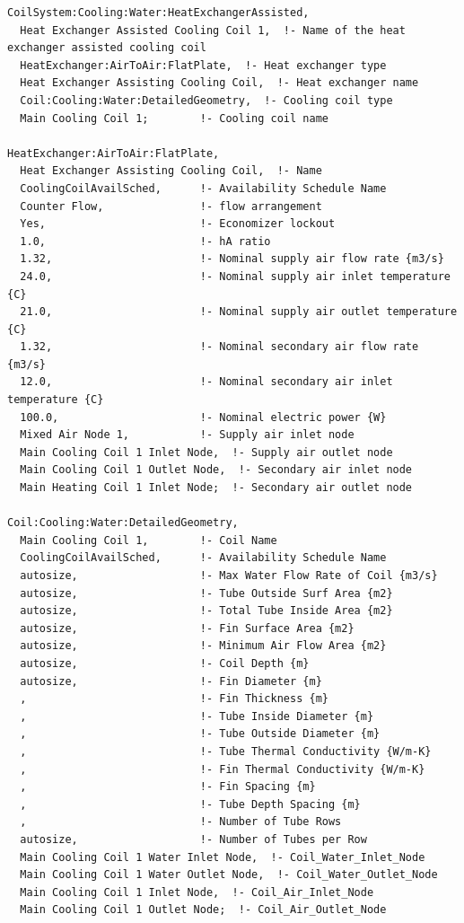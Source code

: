 \begin{lstlisting}
CoilSystem:Cooling:Water:HeatExchangerAssisted,
  Heat Exchanger Assisted Cooling Coil 1,  !- Name of the heat exchanger assisted cooling coil
  HeatExchanger:AirToAir:FlatPlate,  !- Heat exchanger type
  Heat Exchanger Assisting Cooling Coil,  !- Heat exchanger name
  Coil:Cooling:Water:DetailedGeometry,  !- Cooling coil type
  Main Cooling Coil 1;        !- Cooling coil name

HeatExchanger:AirToAir:FlatPlate,
  Heat Exchanger Assisting Cooling Coil,  !- Name
  CoolingCoilAvailSched,      !- Availability Schedule Name
  Counter Flow,               !- flow arrangement
  Yes,                        !- Economizer lockout
  1.0,                        !- hA ratio
  1.32,                       !- Nominal supply air flow rate {m3/s}
  24.0,                       !- Nominal supply air inlet temperature {C}
  21.0,                       !- Nominal supply air outlet temperature {C}
  1.32,                       !- Nominal secondary air flow rate {m3/s}
  12.0,                       !- Nominal secondary air inlet temperature {C}
  100.0,                      !- Nominal electric power {W}
  Mixed Air Node 1,           !- Supply air inlet node
  Main Cooling Coil 1 Inlet Node,  !- Supply air outlet node
  Main Cooling Coil 1 Outlet Node,  !- Secondary air inlet node
  Main Heating Coil 1 Inlet Node;  !- Secondary air outlet node

Coil:Cooling:Water:DetailedGeometry,
  Main Cooling Coil 1,        !- Coil Name
  CoolingCoilAvailSched,      !- Availability Schedule Name
  autosize,                   !- Max Water Flow Rate of Coil {m3/s}
  autosize,                   !- Tube Outside Surf Area {m2}
  autosize,                   !- Total Tube Inside Area {m2}
  autosize,                   !- Fin Surface Area {m2}
  autosize,                   !- Minimum Air Flow Area {m2}
  autosize,                   !- Coil Depth {m}
  autosize,                   !- Fin Diameter {m}
  ,                           !- Fin Thickness {m}
  ,                           !- Tube Inside Diameter {m}
  ,                           !- Tube Outside Diameter {m}
  ,                           !- Tube Thermal Conductivity {W/m-K}
  ,                           !- Fin Thermal Conductivity {W/m-K}
  ,                           !- Fin Spacing {m}
  ,                           !- Tube Depth Spacing {m}
  ,                           !- Number of Tube Rows
  autosize,                   !- Number of Tubes per Row
  Main Cooling Coil 1 Water Inlet Node,  !- Coil_Water_Inlet_Node
  Main Cooling Coil 1 Water Outlet Node,  !- Coil_Water_Outlet_Node
  Main Cooling Coil 1 Inlet Node,  !- Coil_Air_Inlet_Node
  Main Cooling Coil 1 Outlet Node;  !- Coil_Air_Outlet_Node
\end{lstlisting}

